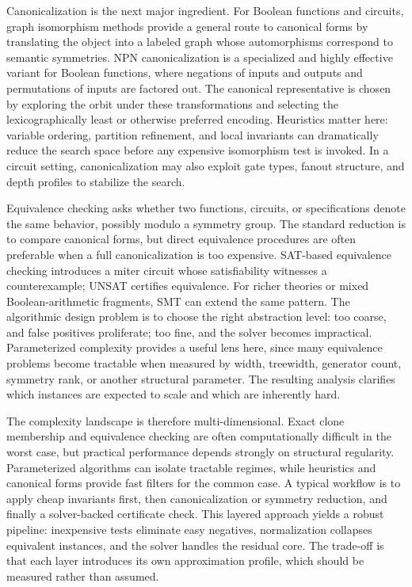 Canonicalization is the next major ingredient. For Boolean functions and circuits, graph isomorphism methods provide a general route to canonical forms by translating the object into a labeled graph whose automorphisms correspond to semantic symmetries. NPN canonicalization is a specialized and highly effective variant for Boolean functions, where negations of inputs and outputs and permutations of inputs are factored out. The canonical representative is chosen by exploring the orbit under these transformations and selecting the lexicographically least or otherwise preferred encoding. Heuristics matter here: variable ordering, partition refinement, and local invariants can dramatically reduce the search space before any expensive isomorphism test is invoked. In a circuit setting, canonicalization may also exploit gate types, fanout structure, and depth profiles to stabilize the search.

Equivalence checking asks whether two functions, circuits, or specifications denote the same behavior, possibly modulo a symmetry group. The standard reduction is to compare canonical forms, but direct equivalence procedures are often preferable when a full canonicalization is too expensive. SAT-based equivalence checking introduces a miter circuit whose satisfiability witnesses a counterexample; UNSAT certifies equivalence. For richer theories or mixed Boolean-arithmetic fragments, SMT can extend the same pattern. The algorithmic design problem is to choose the right abstraction level: too coarse, and false positives proliferate; too fine, and the solver becomes impractical. Parameterized complexity provides a useful lens here, since many equivalence problems become tractable when measured by width, treewidth, generator count, symmetry rank, or another structural parameter. The resulting analysis clarifies which instances are expected to scale and which are inherently hard.

The complexity landscape is therefore multi-dimensional. Exact clone membership and equivalence checking are often computationally difficult in the worst case, but practical performance depends strongly on structural regularity. Parameterized algorithms can isolate tractable regimes, while heuristics and canonical forms provide fast filters for the common case. A typical workflow is to apply cheap invariants first, then canonicalization or symmetry reduction, and finally a solver-backed certificate check. This layered approach yields a robust pipeline: inexpensive tests eliminate easy negatives, normalization collapses equivalent instances, and the solver handles the residual core. The trade-off is that each layer introduces its own approximation profile, which should be measured rather than assumed.

